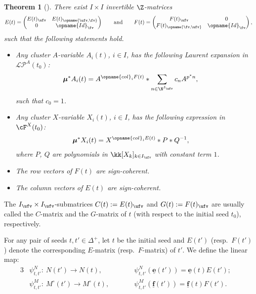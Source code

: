 \documentclass[pdftex]{sigma}
\newcommand{\Mc}{M^\circ}
\newcommand{\LP}{{\mathcal{LP}}}
\newcommand{\Id}{{\opname{Id}}}
\newcommand{\col}{\opname{col}}
\newcommand{\seq}{\boldsymbol{\mu}}%
\newcommand{\ee}{\mathbf{e}}
\newcommand{\ff}{\mathbf{f}}
\newcommand{\uee}{\underline{\ee}}
\newcommand{\uff}{\underline{\ff}}
\newcommand{\high}{\opname{\ufv,\fv}}
\newcommand{\low}{\opname{\fv,\ufv}}
\numberwithin{equation}{section}
\newtheorem{Theorem}{Theorem}[section]
\begin{document}
\begin{Theorem}[{\cite{DerksenWeymanZelevinsky09,gross2018canonical,Tran09}}]\label{thm:cluster_expansion}
There exist $I\times I$ invertible $\Z$-matrices \[E(t)=\left(\begin{matrix}
E(t)_{\ufv} & E(t)_{\high}\\
0 & \Id_{\fv}
\end{matrix}\right)\qquad \text{and}\qquad F(t)=\left(\begin{matrix}
F(t)_{\ufv} & 0\\
F(t)_{\low} & \Id_{\fv}
\end{matrix}\right),\] such that the following statements hold.
\begin{itemize}\itemsep=0pt
\item[$(1)$] Any cluster $A$-variable $A_{i}(t)$, $i\in I$, has the following
Laurent expansion in $\LP^{A}(t_{0})$:
\begin{align*}
\seq^{*}A_{i}(t) & =A^{\col_{i}F(t)}*\sum_{n\in\N^{I_{\ufv}}}c_{n}A^{p^{*}n},
\end{align*}
such that $c_{0}=1$.

\item[$(2)$] Any cluster $X$-variable $X_{i}(t)$, $i\in I$, has the following
expression in $\cF^{X}(t_{0})$:
\begin{align*}
\seq^{*}X_{i}(t) & =X^{\col_{i}E(t)}*P*Q^{-1},
\end{align*}
where $P$, $Q$ are polynomials in $\kk[X_{k}]_{k\in I_{\ufv}}$ with
constant term $1$.

\item[$(3)$] The row vectors of $F(t)$ are sign-coherent.

\item[$(4)$] The column vectors of $E(t)$ are sign-coherent.
\end{itemize}
\end{Theorem}

The $I_{\ufv}\times I_{\ufv}$-submatrices $C(t):=E(t)_{\ufv}$ and
$G(t):=F(t)_{\ufv}$ are usually called the $C$-matrix and the $G$-matrix
of $t$ (with respect to the initial seed $t_{0}$), respectively.

\begin{Definition}
For any pair of seeds $t,t'\in\Delta^{+}$, let $t$ be the
initial seed and $E(t')$ (resp.~$F(t')$) denote the corresponding
$E$-matrix (resp.\ $F$-matrix) of $t'$. We define the linear map:
\begin{alignat*}{3}
& \psi_{t,t'}^{N}\colon\ N(t')\rightarrow N(t),\qquad&& \psi_{t,t'}^{N}(\uee(t'))=\uee(t)E(t');&\\
& \psi_{t,t'}^{M}\colon\ \Mc(t')\rightarrow\Mc(t),\qquad&& \psi_{t,t'}^{M}(\uff(t'))=\uff(t)F(t').&
\end{alignat*}
\end{Definition}
\end{document}
